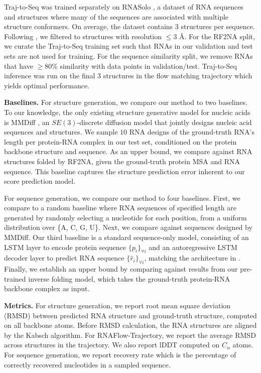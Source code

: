 Traj-to-Seq was trained separately on RNASolo \cite{adamczyk2022rnasolo}, a dataset of RNA sequences and structures where many of the sequences are associated with multiple structure conformers. On average, the dataset contains $3$ structures per sequence. Following \citet{joshi2023multi}, we filtered to structures with resolution $\leq 3$ \AA. For the RF2NA split, we curate the Traj-to-Seq training set such that RNAs in our validation and test sets are not used for training. For the sequence similarity split, we remove RNAs that have $\geq 80\%$ similarity with data points in validation/test.  Traj-to-Seq inference was run on the final $3$ structures in the flow matching trajectory which yields optimal performance.

\textbf{Baselines.} For structure generation, we compare our method to two baselines. To our knowledge, the only existing structure generative model for nucleic acids is MMDiff \cite{morehead2023towards}, an $SE(3)$-discrete diffusion model that jointly designs nucleic acid sequences and structures. We sample $10$ RNA designs of the ground-truth RNA's length per protein-RNA complex in our test set, conditioned on the protein backbone structure and sequence. As an upper bound, we compare against RNA structures folded by RF2NA, given the ground-truth protein MSA and RNA sequence. This baseline captures the structure prediction error inherent to our score prediction model.

For sequence generation, we compare our method to four baselines. First, we compare to a random baseline where RNA sequences of specified length are generated by randomly selecting a nucleotide for each position, from a uniform distribution over \{A, C, G, U\}. Next, we compare against sequences designed by MMDiff. Our third baseline is a standard sequence-only model, consisting of an LSTM layer to encode protein sequence $\{p_i\}_{\forall i}$ and an autoregressive LSTM decoder layer to predict RNA sequence $\{\hat r_i\}_{\forall i}$, matching the architecture in \citet{im2019generative}. Finally, we establish an upper bound by comparing against results from our pre-trained inverse folding model, which takes the ground-truth protein-RNA backbone complex as input.

\textbf{Metrics.} For structure generation, we report root mean square deviation (RMSD) between predicted RNA structure and ground-truth structure, computed on all backbone atoms. Before RMSD calculation, the RNA structures are aligned by the Kabsch algorithm. For RNAFlow-Trajectory, we report the average RMSD across structures in the trajectory. We also report lDDT computed on $C_{\alpha}$ atoms. For sequence generation, we report recovery rate which is the percentage of correctly recovered nucleotides in a sampled sequence.

